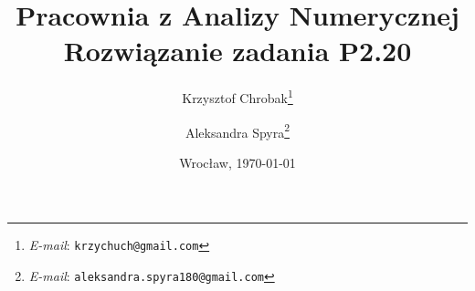 \documentclass[12pt,a4paper,wide,authortitle]{mwart}
\numberwithin{figure}{section}
\numberwithin{table}{section}
\begin{document}
\title{\LARGE \textbf{Pracownia z Analizy Numerycznej}\\Rozwiązanie zadania P2.20}
\author{Krzysztof Chrobak\thanks{\textit{E-mail}:
\texttt{krzychuch@gmail.com}} \and Aleksandra Spyra\thanks{\textit{E-mail}:
\texttt{aleksandra.spyra180@gmail.com}}}
\date {Wrocław, \today}
\maketitle
\tableofcontents
\newpage







\end{document}
